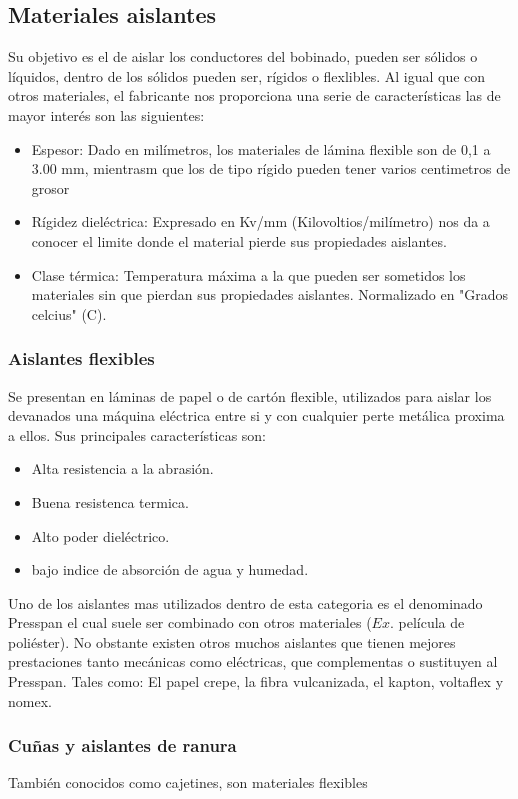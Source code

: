 \documentclass{report}
\begin{document}
    \subsection{Materiales aislantes}\label{ssec:materiales_aislantes}
      Su objetivo es el de aislar los conductores del bobinado, pueden ser sólidos o líquidos, dentro de los sólidos pueden ser,
      rígidos o flexlibles.
      \fspace{1em}
      Al igual que con otros materiales, el fabricante nos proporciona una serie de características las de mayor interés son las siguientes:
      \begin{itemize}

        \item{Espesor:} Dado en milímetros, los materiales de lámina flexible son de 0,1 a 3.00 mm,
          mientrasm que los de tipo rígido pueden tener varios centimetros de grosor

        \item{Rígidez dieléctrica:} Expresado en Kv/mm (Kilovoltios/milímetro) nos da a conocer el limite donde el material pierde
          sus propiedades aislantes.

        \item{Clase térmica:} Temperatura máxima a la que pueden ser sometidos los materiales sin que pierdan sus propiedades 
          aislantes. Normalizado en "Grados celcius" (C).

      \end{itemize}
        \subsubsection{Aislantes flexibles}\label{sssec:aislantes_flexibles}
          Se presentan en láminas de papel o de cartón flexible, utilizados para aislar los devanados una máquina eléctrica
          entre si y con cualquier perte metálica proxima a ellos. Sus principales características son:
          \begin{itemize}
            \item{} Alta resistencia a la abrasión.
            \item{} Buena resistenca termica.
            \item{} Alto poder dieléctrico.
            \item{} bajo indice de absorción de agua y humedad.
          \end{itemize}
          \vspace{1em}
          Uno de los aislantes mas utilizados dentro de esta categoria es el denominado Presspan el cual suele ser combinado con 
          otros materiales ($Ex.$ película de poliéster). No obstante existen otros muchos aislantes que tienen mejores 
          prestaciones tanto mecánicas como eléctricas, que complementas o sustituyen al Presspan. Tales como: 
          El papel crepe, la fibra vulcanizada, el kapton, voltaflex y nomex.

        \subsubsection{Cuñas y aislantes de ranura}\label{sssec:cuñas_y_aislantes_ranura}
          También conocidos como cajetines, son materiales flexibles     
\end{document}
